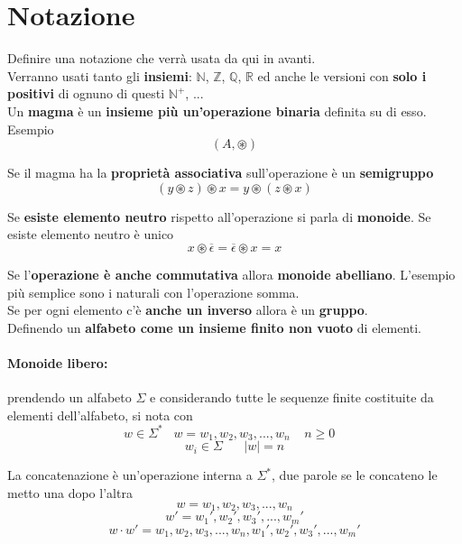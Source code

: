 
\section{Notazione}

Definire una notazione che verrà usata da qui in avanti. \\

Verranno usati tanto gli \textbf{insiemi}: $\mathbb{N}$, $\mathbb{Z}$, $\mathbb{Q}$, $\mathbb{R}$ ed anche le versioni con \textbf{solo i positivi} di ognuno di questi $\mathbb{N}^+$, ... \\

Un \textbf{magma} è un \textbf{insieme più un'operazione binaria} definita su di esso. Esempio
$$ (A, \circledast) $$

Se il magma ha la \textbf{proprietà associativa} sull'operazione è un \textbf{semigruppo}
$$ (y \circledast z) \circledast x = y \circledast (z \circledast x) $$

Se \textbf{esiste elemento neutro} rispetto all'operazione si parla di \textbf{monoide}. Se esiste elemento neutro è unico
$$ x \circledast \overline{\epsilon} = \overline{\epsilon} \circledast x = x $$

Se l'\textbf{operazione è anche commutativa} allora \textbf{monoide abelliano}. L'esempio più semplice sono i naturali con l'operazione somma. \\

Se per ogni elemento c'è \textbf{anche un inverso} allora è un \textbf{gruppo}. \\

Definendo un \textbf{alfabeto come un insieme finito non vuoto} di elementi. \\

\paragraph{Monoide libero:} prendendo un alfabeto $\Sigma$ e considerando tutte le sequenze finite costituite da elementi dell'alfabeto, si nota con 
$$w \in \Sigma^{\ast} \;\;\; w = w_1, w_2, w_3, ... , w_n \;\;\;\; n \geq 0 \;\;\;$$
$$ w_i \in \Sigma \;\;\;\;\;\; |w| = n$$

\newpage

La concatenazione è un'operazione interna a $\Sigma^{\ast}$, due parole se le concateno le metto una dopo l'altra
$$ w = w_1, w_2, w_3, ... , w_n $$ 
$$ w' = w_1', w_2', w_3', ... , w_m' $$ 
$$ w \cdot w' = w_1, w_2, w_3, ... , w_n, w_1', w_2', w_3', ... , w_m'  $$

